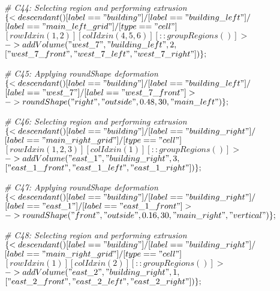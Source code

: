 \noindent \textit{\# C44: Selecting region and performing extrusion}\\
$\{< descendant() [label=="building"] / [label=="building\_left"] / $\\
$[label=="main\_left\_grid"] / [type=="cell"] $\\
$[rowIdx in (1, 2)] [colIdx in (4, 5, 6)] [::groupRegions()] > $\\
$-> addVolume("west\_7", "building\_left", 2, $\\
$["west\_7\_front", "west\_7\_left", "west\_7\_right"])\};$

\noindent \textit{\# C45: Applying roundShape deformation}\\
$\{< descendant() [label=="building"] / [label=="building\_left"] / $\\
$[label=="west\_7"] / [label=="west\_7\_front"] > $\\
$-> roundShape("right", "outside", 0.48, 30, "main\_left")\};$

\noindent \textit{\# C46: Selecting region and performing extrusion}\\
$\{< descendant() [label=="building"] / [label=="building\_right"] / $\\
$[label=="main\_right\_grid"] / [type=="cell"] $\\
$[rowIdx in (1, 2, 3)] [colIdx in (1)] [::groupRegions()] > $\\
$-> addVolume("east\_1", "building\_right", 3, $\\
$["east\_1\_front", "east\_1\_left", "east\_1\_right"])\};$

\noindent \textit{\# C47: Applying roundShape deformation}\\
$\{< descendant() [label=="building"] / [label=="building\_right"] / $\\
$[label=="east\_1"] / [label=="east\_1\_front"] > $\\
$-> roundShape("front", "outside", 0.16, 30, "main\_right", "vertical")\};$

\noindent \textit{\# C48: Selecting region and performing extrusion}\\
$\{< descendant() [label=="building"] / [label=="building\_right"] / $\\
$[label=="main\_right\_grid"] / [type=="cell"] $\\
$[rowIdx in (1)] [colIdx in (2)] [::groupRegions()] > $\\
$-> addVolume("east\_2", "building\_right", 1, $\\
$["east\_2\_front", "east\_2\_left", "east\_2\_right"])\};$

